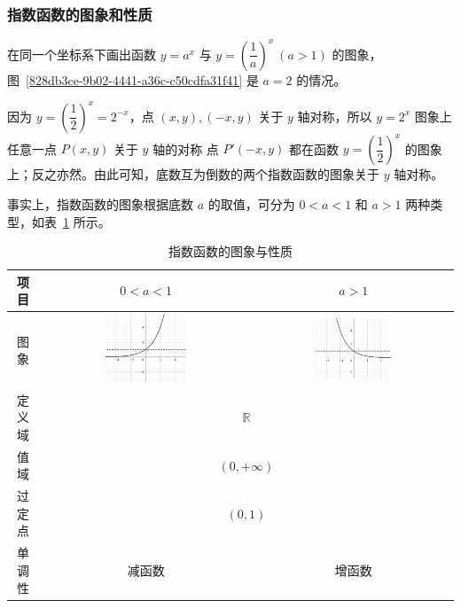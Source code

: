 \documentclass[a4paper,openany]{ctexbook}
\begin{document}
\subsubsection{指数函数的图象和性质}

在同一个坐标系下画出函数 \(y=a^x\) 与 \(y=\left( \dfrac{1}{a} \right)^x\ (a>1)\) 的图象，图~\ref{828db3ce-9b02-4441-a36c-c50cdfa31f41} 是 \(a=2\) 的情况。

因为 \(y={\left( \dfrac{1}{2} \right)}^x=2^{-x}\)，点 \((x,y),(-x,y)\) 关于 \(y\) 轴对称，所以 \(y=2^x\) 图象上任意一点 \(P(x,y)\) 关于 \(y\) 轴的对称
点 \(P'(-x,y)\) 都在函数 \(y={\left( \dfrac{1}{2} \right)}^x\) 的图象上；反之亦然。由此可知，底数互为倒数的两个指数函数的图象关于 \(y\) 轴对称。
\label{329e9729-2614-4d87-809f-317659c55a0d}

事实上，指数函数的图象根据底数 \(a\) 的取值，可分为 \(0<a<1\) 和 \(a>1\) 两种类型，如表~\ref{tbl:viuuhjuutuxlxkvi} 所示。

\begin{table}
    \begin{tabular}{|c|c|c|} \hline
        项目   & \(0<a<1\)                                          & \(a>1\)                                            \\ \hline
        图象   & \includegraphics[width=0.4\textwidth]{image27.png} & \includegraphics[width=0.4\textwidth]{image28.png} \\ \hline
        定义域 & \multicolumn{2}{c|}{\(\mathbb{R} \)}                                                                    \\ \hline
        值域   & \multicolumn{2}{c|}{\((0,+\infty )\)}                                                                   \\ \hline
        过定点 & \multicolumn{2}{c|}{\((0,1)\)}                                                                          \\ \hline
        单调性 & 减函数                                             & 增函数                                             \\ \hline
    \end{tabular}
    \caption{指数函数的图象与性质} \label{tbl:viuuhjuutuxlxkvi}
\end{table}
\end{document}
